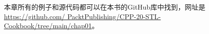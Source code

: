 本章所有的例子和源代码都可以在本书的GitHub库中找到，网址是\url{https://github.com/	PacktPublishing/CPP-20-STL-Cookbook/tree/main/chap01}。


